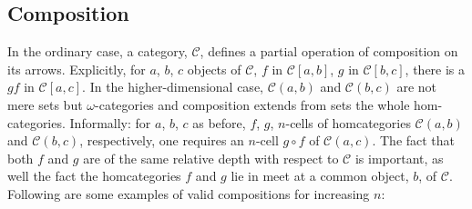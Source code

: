 \documentclass[a4paper]{article}
\newcommand{\homcat}[3]{{#1}[#2,#3]}
\begin{document}

\subsection{Composition}\label{sec:composition}
%
\newcommand{\cC}{\mathcal{C}}
%
In the ordinary case, a category, $\mathcal{C}$, defines a partial
operation of composition on its arrows. Explicitly, for $a$, $b$, $c$
objects of $\mathcal{C}$, $f$ in $\homcat{\mathcal{C}}{a}{b}$, $g$  in
$\homcat{\mathcal{C}}{b}{c}$, there is a $gf$ in $\homcat{\mathcal{C}}{a}{c}$.
%
In the higher-dimensional case, $\cC(a,b)$ and $\cC(b,c)$ are not mere
sets but $\omega$-categories and composition extends from sets the
whole hom-categories. Informally: for $a$, $b$, $c$ as before, $f$,
$g$, $n$-cells of homcategories $\cC(a,b)$ and $\cC(b,c)$,
respectively, one requires an $n$-cell $g\circ f$ of $\cC(a,c)$. The
fact that both $f$ and $g$ are of the same relative depth with respect
to $\cC$ is important, as well the fact the homcategories $f$ and $g$
lie in meet at a common object, $b$, of $\cC$. Following are some
examples of valid compositions for increasing $n$:
\end{document}
